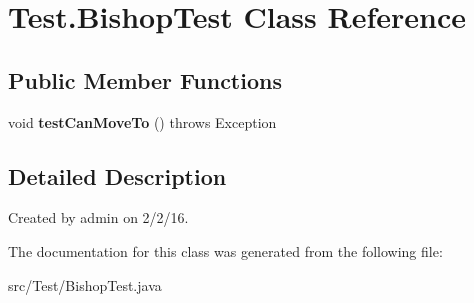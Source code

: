\hypertarget{class_test_1_1_bishop_test}{}\section{Test.\+Bishop\+Test Class Reference}
\label{class_test_1_1_bishop_test}
\subsection*{Public Member Functions}
\begin{DoxyCompactItemize}
\item 
void {\bfseries test\+Can\+Move\+To} ()  throws Exception \hypertarget{class_test_1_1_bishop_test_a2b655d0ca48789dca494415fc652abf2}{}\label{class_test_1_1_bishop_test_a2b655d0ca48789dca494415fc652abf2}

\end{DoxyCompactItemize}


\subsection{Detailed Description}
Created by admin on 2/2/16. 

The documentation for this class was generated from the following file\+:\begin{DoxyCompactItemize}
\item 
src/\+Test/Bishop\+Test.\+java\end{DoxyCompactItemize}
